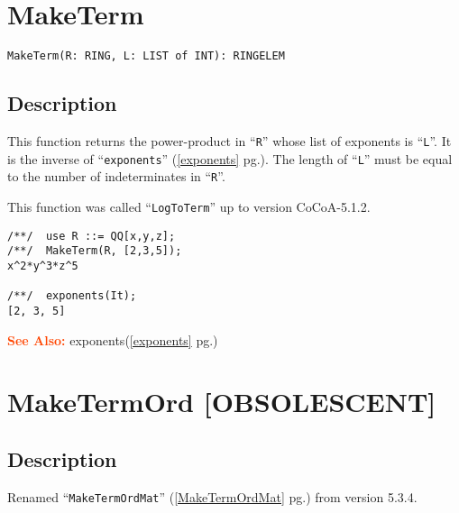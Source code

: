 \documentclass[a4paper]{mybook}
\newenvironment{command}{}{} %
\newcommand\SeeAlso{\par\textcolor{OrangeRed}{\textbf{\large See Also: }}}
\begin{document}
\section{MakeTerm}
\label{MakeTerm}
\begin{command} %


\begin{Verbatim}[label=syntax, rulecolor=\color{MidnightBlue},
frame=single]
MakeTerm(R: RING, L: LIST of INT): RINGELEM
\end{Verbatim}


\subsection*{Description}

This function returns the power-product in ``\verb&R&'' whose list of exponents is
``\verb&L&''.  It is the inverse of ``\verb&exponents&'' (\ref{exponents} pg.\pageref{exponents}).  The length of ``\verb&L&'' must be equal
to the number of indeterminates in ``\verb&R&''.
\par 
This function was called ``\verb&LogToTerm&'' up to version CoCoA-5.1.2.
\begin{Verbatim}[label=example, rulecolor=\color{PineGreen}, frame=single]
/**/  use R ::= QQ[x,y,z];
/**/  MakeTerm(R, [2,3,5]);
x^2*y^3*z^5

/**/  exponents(It);
[2, 3, 5]
\end{Verbatim}


\SeeAlso %
  exponents(\ref{exponents} pg.\pageref{exponents})
\end{command} %

\section{MakeTermOrd [OBSOLESCENT]}
\label{MakeTermOrd [OBSOLESCENT]}
\begin{command} %



\subsection*{Description}

Renamed ``\verb&MakeTermOrdMat&'' (\ref{MakeTermOrdMat} pg.\pageref{MakeTermOrdMat}) from version 5.3.4.

\end{command} %
\end{document}
